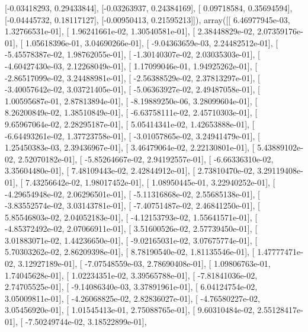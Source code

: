 \documentclass{article}
\begin{document}
       [-0.03418293,  0.29433844],
       [-0.03263937,  0.24384169],
       [ 0.09718584,  0.35694594],
       [-0.04445732,  0.18117127],
       [-0.00950413,  0.21595213]]), array([[  6.46977945e-03,   1.32766531e-01],
       [  1.96241661e-02,   1.30540581e-01],
       [  2.38448829e-02,   2.07359176e-01],
       [  1.05618396e-01,   3.04690266e-01],
       [ -9.04363659e-03,   2.24482512e-01],
       [ -5.45578387e-02,   1.98762055e-01],
       [ -1.30140307e-02,   2.03035303e-01],
       [ -4.60427430e-03,   2.12268049e-01],
       [  1.17099046e-01,   1.94925262e-01],
       [ -2.86517099e-02,   3.24488981e-01],
       [ -2.56388529e-02,   2.37813297e-01],
       [ -3.40057642e-02,   3.03721405e-01],
       [ -5.06363927e-02,   2.49487058e-01],
       [  1.00595687e-01,   2.87813894e-01],
       [ -8.19889250e-06,   3.28099604e-01],
       [  8.26200849e-02,   1.38510849e-01],
       [ -6.63758111e-02,   2.45710303e-01],
       [  9.65967064e-02,   2.28295187e-01],
       [  5.05414341e-02,   1.42653888e-01],
       [ -6.64493261e-02,   1.37723758e-01],
       [ -3.01057865e-02,   3.24941479e-01],
       [  1.25450383e-03,   2.39436967e-01],
       [  3.46479064e-02,   2.22130801e-01],
       [  5.43889102e-02,   2.52070182e-01],
       [ -5.85264667e-02,   2.94192557e-01],
       [ -6.66336310e-02,   3.35604480e-01],
       [  7.48109443e-02,   2.42844912e-01],
       [  2.73810470e-02,   3.29119408e-01],
       [  7.43256642e-02,   1.98017452e-01],
       [  1.08950445e-01,   3.22940252e-01],
       [ -4.29654948e-02,   2.06296501e-01],
       [ -5.11316868e-02,   2.55685138e-01],
       [ -3.83552574e-02,   3.03143781e-01],
       [ -7.40751487e-02,   2.46841250e-01],
       [  5.85546803e-02,   2.04052183e-01],
       [ -4.12153793e-02,   1.55641571e-01],
       [ -4.85372492e-02,   2.07066911e-01],
       [  3.51600526e-02,   2.57739450e-01],
       [  3.01883071e-02,   1.44236650e-01],
       [ -9.02165031e-02,   3.07675774e-01],
       [  5.70303262e-02,   2.86209398e-01],
       [  8.78190540e-02,   1.81135546e-01],
       [  1.47777471e-02,   3.12927189e-01],
       [ -7.07548559e-03,   2.78690408e-01],
       [  1.09806763e-01,   1.74045628e-01],
       [  1.02234351e-02,   3.39565788e-01],
       [ -7.81841036e-02,   2.74705525e-01],
       [ -9.14086340e-03,   3.37891961e-01],
       [  6.04124754e-02,   3.05009811e-01],
       [ -4.26068825e-02,   2.82836027e-01],
       [ -4.76580227e-02,   3.05456920e-01],
       [  1.01545413e-01,   2.75088765e-01],
       [  9.60310484e-02,   2.55128417e-01],
       [ -7.50249744e-02,   3.18522899e-01],
\end{document}
